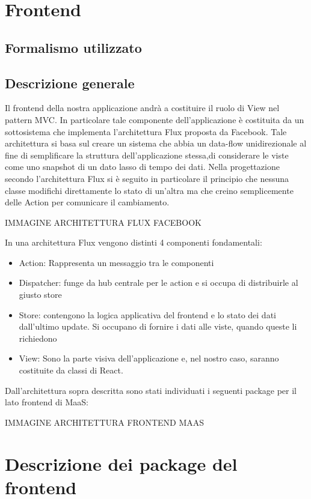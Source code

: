 \section{Frontend}
\subsection{Formalismo utilizzato}

\subsection{Descrizione generale}

Il frontend della nostra applicazione andrà a costituire il ruolo di View nel pattern MVC. In particolare tale componente dell'applicazione è costituita da un sottosistema che implementa l'architettura Flux proposta da Facebook. Tale architettura si basa sul creare un sistema che abbia un data-flow unidirezionale al fine di semplificare la struttura dell'applicazione stessa,di considerare le viste come uno snapshot di un dato lasso di tempo dei dati.
Nella progettazione secondo l'architettura Flux si è seguito in particolare il principio che nessuna classe modifichi direttamente lo stato di un'altra ma che creino semplicemente delle Action per comunicare il cambiamento.

IMMAGINE ARCHITETTURA FLUX FACEBOOK

In una architettura Flux vengono distinti 4 componenti fondamentali:

\begin{itemize}
\item Action: Rappresenta un messaggio tra le componenti
\item Dispatcher: funge da hub centrale per le action e si occupa di distribuirle al giusto store
\item Store: contengono la logica applicativa del frontend e lo stato dei dati dall'ultimo update. Si occupano di fornire i dati alle viste, quando queste li richiedono
\item View: Sono la parte visiva dell'applicazione e, nel nostro caso, saranno costituite da classi di React.
\end{itemize}

Dall'architettura sopra descritta sono stati individuati i seguenti package per il lato frontend di MaaS:

IMMAGINE ARCHITETTURA FRONTEND MAAS

\section{Descrizione dei package del frontend}

